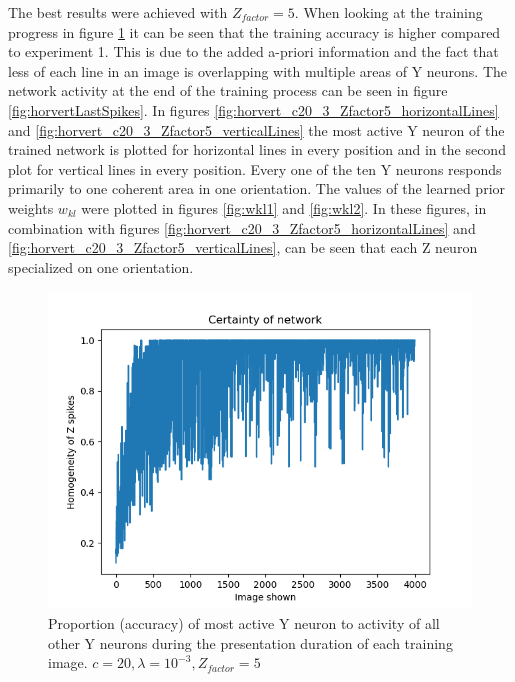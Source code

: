 The best results were achieved with $Z_{factor} = 5$. When looking at the training progress in figure \ref{fig:horvert_c20_3_Zfactor5_averageZ} it can be seen that the training accuracy is higher compared to experiment 1. This is due to the added a-priori information and the fact that less of each line in an image is overlapping with multiple areas of Y neurons. The network activity at the end of the training process can be seen in figure \ref{fig:horvertLastSpikes}. In figures \ref{fig:horvert_c20_3_Zfactor5_horizontalLines} and \ref{fig:horvert_c20_3_Zfactor5_verticalLines} the most active Y neuron of the trained network is plotted for horizontal lines in every position and in the second plot for vertical lines in every position. Every one of the ten Y neurons responds primarily to one coherent area in one orientation. The values of the learned prior weights $w_{kl}$ were plotted in figures \ref{fig:wkl1} and \ref{fig:wkl2}. In these figures, in combination with figures \ref{fig:horvert_c20_3_Zfactor5_horizontalLines} and \ref{fig:horvert_c20_3_Zfactor5_verticalLines}, can be seen that each Z neuron specialized on one orientation.

\begin{figure}
  \includegraphics[width=\linewidth]{figures/horvert/horvert_c20_3_Zfactor5_averageZ.png}
  \caption{Proportion (accuracy) of most active Y neuron  to activity of all other Y neurons during the presentation duration of each training image. $c = 20, \lambda = 10^{-3}, Z_{factor} = 5$}
  \label{fig:horvert_c20_3_Zfactor5_averageZ}
\end{figure}

